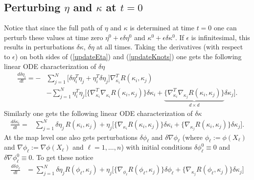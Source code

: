 \documentclass[noinfoline]{imsart}
\begin{document}
{%
\subsection{Perturbing $\eta$ and $\kappa$ at $t=0$}
Notice that since the full path of $\eta$ and $\kappa$ is determined at time $t=0$ one can perturb these values at time zero  $\eta^0+\epsilon \delta \eta^0$ and $\kappa^0+ \epsilon \delta \kappa^0$. If $\epsilon$ is infinitesimal, this results in perturbations $\delta \kappa$, $\delta \eta$ at all times.
Taking the derivatives (with respect to $\epsilon$) on both sides of (\ref{updateEta}) and (\ref{updateKnots}) one gets the following linear ODE characterization of $\delta\eta$
\begin{align}
\frac{d\delta \eta_i}{dt} = -&\sum_{j=1}^N \bigl[ \delta\eta^T_i \eta_j +\eta^T_i \delta\eta_j    \bigr] \nabla^T_{\kappa_i}R(\kappa_i,\kappa_j) \\
&-\sum_{j=1}^N \eta^T_i \eta_j  \bigl[  \{\nabla^T_{\kappa_i}\nabla_{\kappa_i}R(\kappa_i,\kappa_j)\} \delta\kappa_i +  \underbrace{ \{\nabla^T_{\kappa_i}\nabla_{\kappa_j}R(\kappa_i,\kappa_j)\} }_{d\times d}\delta\kappa_j \bigr].
\end{align}
Similarly one gets the following linear ODE characterization of $\delta\kappa$
\begin{align}
\frac{d\delta\kappa_i}{dt}=&\sum_{j=1}^N \delta\eta_j\, R(\kappa_i,\kappa_j) + \eta_j \bigl[ \{\nabla_{\kappa_i} R(\kappa_i,\kappa_j)\} \delta\kappa_i + \{\nabla_{\kappa_j} R(\kappa_i,\kappa_j)\} \delta\kappa_j   \bigr].
\end{align}
At the map level one also gets perturbations $\delta \phi_\ell$ and $\delta \nabla\phi_\ell$ (where $\phi_\ell := \phi(X_\ell)$ and $\nabla\phi_\ell := \nabla\phi(X_\ell)$ and $\ell=1,\ldots, n$) with initial conditions $\delta \phi_\ell^0 \equiv 0$ and  $\delta \nabla \phi^0_\ell \equiv 0$.
To get these notice
\begin{align}
\frac{d\delta\phi_\ell}{dt} &= \sum_{j=1}^N \delta\eta_j R(\phi_\ell,\kappa_j) +\eta_j\bigl[ \{\nabla_{\phi_\ell}R(\phi_\ell,\kappa_j)\} \delta\phi_\ell   +  \{\nabla_{\kappa_j}R(\phi_\ell,\kappa_j)\} \delta\kappa_j  \bigr]

\end{align}}
\end{document}
